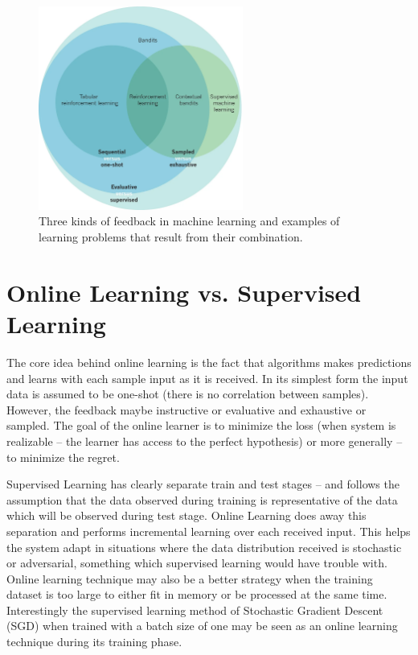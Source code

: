 \documentclass[11pt]{article}
\begin{document}
\begin{figure}[ht]
    \centering
    \includegraphics[width=0.6\textwidth]{Littman.png}
    \caption{Three kinds of feedback in machine learning and examples of learning problems that result from their combination. \cite{littman2015reinforcement}}
    \label{fig:learning_prob}
\end{figure}

\section{Online Learning vs. Supervised Learning}
The core idea behind online learning is the fact that algorithms makes predictions and learns with each sample input as it is received. In its simplest form the input data is assumed to be one-shot (there is no correlation between samples). However, the feedback maybe instructive or evaluative and exhaustive or sampled. The goal of the online learner is to minimize the loss (when system is realizable – the learner has access to the perfect hypothesis) or more generally – to minimize the regret. 

Supervised Learning has clearly separate train and test stages – and follows the assumption that the data observed during training is representative of the data which will be observed during test stage.
Online Learning does away this separation and performs incremental learning over each received input. This helps the system adapt in situations where the data distribution received is stochastic or adversarial, something which supervised learning would have trouble with. Online learning technique may also be a better strategy when the training dataset is too large to either fit in memory or be processed at the same time. Interestingly the supervised learning method of Stochastic Gradient Descent (SGD) when trained with a batch size of one may be seen as an online learning technique during its training phase.  
\end{document}
